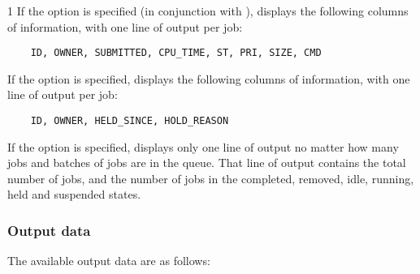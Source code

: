 \begin{ManPage}{\label{man-condor-q}}{1}
If the  option is specified (in conjunction with ),
 displays the
following columns of information, with one line of output per job:
\begin{verbatim}
    ID, OWNER, SUBMITTED, CPU_TIME, ST, PRI, SIZE, CMD
\end{verbatim}

If the  option is specified,  displays the
following columns of information, with one line of output per job:
\begin{verbatim}
    ID, OWNER, HELD_SINCE, HOLD_REASON
\end{verbatim}

If the  option is specified,  displays
only one line of output no matter how many jobs and batches of
jobs are in the queue.  That line of output contains the total
number of jobs, and the number of jobs in the completed, removed,
idle, running, held and suspended states.

\subsubsection*{Output data}
The available output data are as follows:


\end{ManPage}
